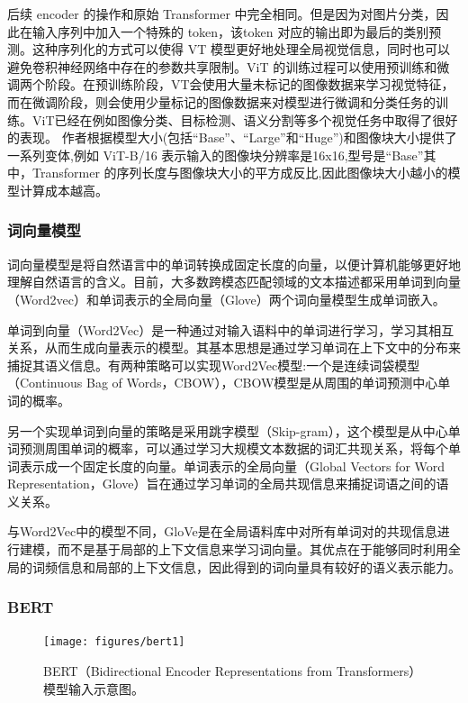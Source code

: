 \documentclass[a4paper]{zreport}
\begin{document}
后续 encoder 的操作和原始 Transformer 中完全相同。但是因为对图片分类，因此在输入序列中加入一个特殊的 token，该token 对应的输出即为最后的类别预测。这种序列化的方式可以使得 VT 模型更好地处理全局视觉信息，同时也可以避免卷积神经网络中存在的参数共享限制。ViT 的训练过程可以使用预训练和微调两个阶段。在预训练阶段，VT会使用大量未标记的图像数据来学习视觉特征，而在微调阶段，则会使用少量标记的图像数据来对模型进行微调和分类任务的训练。ViT已经在例如图像分类、目标检测、语义分割等多个视觉任务中取得了很好的表现。 作者根据模型大小(包括“Base”、“Large”和“Huge”)和图像块大小提供了一系列变体,例如 ViT-B/16 表示输入的图像块分辨率是16x16,型号是“Base”其中，Transformer 的序列长度与图像块大小的平方成反比,因此图像块大小越小的模型计算成本越高。


\subsubsection{词向量模型}

词向量模型是将自然语言中的单词转换成固定长度的向量，以便计算机能够更好地理解自然语言的含义。目前，大多数跨模态匹配领域的文本描述都采用单词到向量（Word2vec）和单词表示的全局向量（Glove）两个词向量模型生成单词嵌入。

单词到向量（Word2Vec）是一种通过对输入语料中的单词进行学习，学习其相互关系，从而生成向量表示的模型。其基本思想是通过学习单词在上下文中的分布来捕捉其语义信息。有两种策略可以实现Word2Vec模型:一个是连续词袋模型（Continuous Bag of Words，CBOW），CBOW模型是从周围的单词预测中心单词的概率。

另一个实现单词到向量的策略是采用跳字模型（Skip-gram），这个模型是从中心单词预测周围单词的概率，可以通过学习大规模文本数据的词汇共现关系，将每个单词表示成一个固定长度的向量。单词表示的全局向量（Global Vectors for Word Representation，Glove）旨在通过学习单词的全局共现信息来捕捉词语之间的语义关系。

与Word2Vec中的模型不同，GloVe是在全局语料库中对所有单词对的共现信息进行建模，而不是基于局部的上下文信息来学习词向量。其优点在于能够同时利用全局的词频信息和局部的上下文信息，因此得到的词向量具有较好的语义表示能力。

\subsubsection{BERT}

\begin{figure}[h]
\centering
\texttt{[image: figures/bert1]}
\caption{BERT（Bidirectional Encoder Representations from Transformers）模型输入示意图。}
\label{fig:bert1}
\end{figure}
\end{document}
